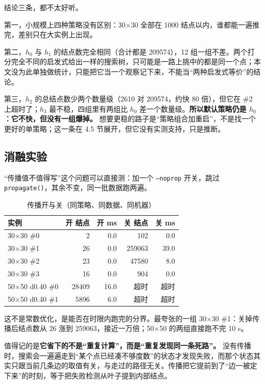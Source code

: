 \documentclass[12pt,a4paper,fontset=windows]{ctexart}
\newcommand{\code}[1]{\texttt{#1}}
\begin{document}
结论三条，都不太好听。

第一，小规模上四种策略没有区别：30×30 全部在 1000 结点以内，谁都能一遍推完，差别只在大实例上出现。

第二，$h_0$ 与 $h_1$ 的结点数完全相同（合计都是 209574），12 组一组不差。两个打分完全不同的启发式给出一样的搜索树，只可能是一路上挑中的都是同一个点；本文没为此单独做统计，只能把它当一个观察记下来，不能当“两种启发式等价”的结论。

第三，$h_2$ 的总结点数少两个数量级（2610 对 209574，约快 80 倍），但它在 \#2 上超时了；$h_3$ 最不稳，四组里有两组比 $h_0$ 差一个数量级。\textbf{所以默认策略仍是 $h_0$：它不快，但没有一组爆掉。} 想要更稳的路子是“策略组合加重启”，不是找一个更好的单策略；这一条在 4.5 节展开，但它没有实测支持，只是推断。

\subsection{消融实验}

“传播值不值得写”这个问题可以直接测：加一个 \code{--noprop} 开关，跳过 \code{propagate()}，其余不变，同一批数据跑两遍。

\begin{table}[htbp]
\centering
\caption{传播开与关（同策略、同数据、同机器）}
\label{tab:prop}
\small
\begin{tabular}{lrrrr}
\toprule
\rowcolor{gray!12}实例 & 开 结点 & 开 ms & 关 结点 & 关 ms \\
\midrule
30×30 \#0 & 2 & 0.0 & 102 & 0.0 \\
30×30 \#1 & 26 & 0.0 & 259063 & 39.0 \\
30×30 \#2 & 23 & 0.0 & 47580 & 8.0 \\
30×30 \#3 & 16 & 0.0 & 904 & 0.0 \\
50×50 d0.40 \#0 & 28409 & 16.0 & 超时 & 超时 \\
50×50 d0.40 \#1 & 5896 & 6.0 & 超时 & 超时 \\
\bottomrule
\end{tabular}
\end{table}

这不是常数优化，是能否在时限内跑完的分界。最夸张的一组 30×30 \#1：关掉传播后结点数从 26 涨到 259063，接近一万倍；50×50 的两组直接跑不完 10 s。

值得记的是\textbf{它省下的不是“重复计算”，而是“重复发现同一条死路”。} 没有传播时，搜索会一遍遍走到“某个点已经凑不够度数”的状态才发现失败，而那个状态其实只跟当前几条边的取值有关，与走过的路径无关。传播把它提前到了“边一被定下来”的时刻，等于把失败检测从叶子提到内部结点。
\end{document}
